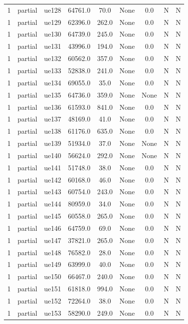 \begin{table}[ht]
\begin{tabular}{|c|c|c|c|c|c|c|c|c|}
1 & partial & ue128 & 64761.0 & 70.0 & None & 0.0 & N & N \\
1 & partial & ue129 & 62396.0 & 262.0 & None & 0.0 & N & N \\
1 & partial & ue130 & 64739.0 & 245.0 & None & 0.0 & N & N \\
1 & partial & ue131 & 43996.0 & 194.0 & None & 0.0 & N & N \\
1 & partial & ue132 & 60562.0 & 357.0 & None & 0.0 & N & N \\
1 & partial & ue133 & 52838.0 & 241.0 & None & 0.0 & N & N \\
1 & partial & ue134 & 69055.0 & 35.0 & None & 0.0 & N & N \\
1 & partial & ue135 & 64736.0 & 359.0 & None & None & N & N \\
1 & partial & ue136 & 61593.0 & 841.0 & None & 0.0 & N & N \\
1 & partial & ue137 & 48169.0 & 41.0 & None & 0.0 & N & N \\
1 & partial & ue138 & 61176.0 & 635.0 & None & 0.0 & N & N \\
1 & partial & ue139 & 51934.0 & 37.0 & None & None & N & N \\
1 & partial & ue140 & 56624.0 & 292.0 & None & None & N & N \\
1 & partial & ue141 & 51748.0 & 38.0 & None & 0.0 & N & N \\
1 & partial & ue142 & 60168.0 & 46.0 & None & 0.0 & N & N \\
1 & partial & ue143 & 60754.0 & 243.0 & None & 0.0 & N & N \\
1 & partial & ue144 & 80959.0 & 34.0 & None & 0.0 & N & N \\
1 & partial & ue145 & 60558.0 & 265.0 & None & 0.0 & N & N \\
1 & partial & ue146 & 64759.0 & 69.0 & None & 0.0 & N & N \\
1 & partial & ue147 & 37821.0 & 265.0 & None & 0.0 & N & N \\
1 & partial & ue148 & 76582.0 & 28.0 & None & 0.0 & N & N \\
1 & partial & ue149 & 63999.0 & 40.0 & None & 0.0 & N & N \\
1 & partial & ue150 & 66467.0 & 240.0 & None & 0.0 & N & N \\
1 & partial & ue151 & 61818.0 & 994.0 & None & 0.0 & N & N \\
1 & partial & ue152 & 72264.0 & 38.0 & None & 0.0 & N & N \\
1 & partial & ue153 & 58290.0 & 249.0 & None & 0.0 & N & N \\

\end{tabular}
\end{table}
